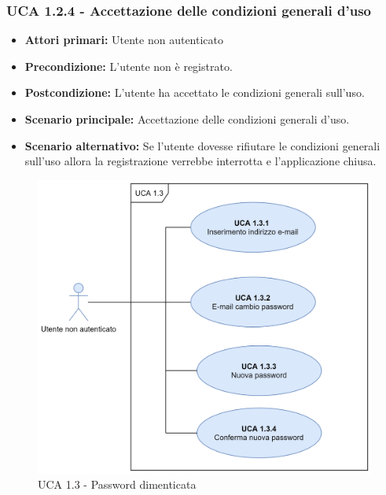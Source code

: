 \subsubsection{UCA 1.2.4 - Accettazione delle condizioni generali d'uso}%
\begin{itemize}
\item \textbf{Attori primari:} Utente non autenticato
\item \textbf{Precondizione:} L'utente non è registrato.
\item \textbf{Postcondizione:} L'utente ha accettato le condizioni generali sull'uso.
\item \textbf{Scenario principale:} Accettazione delle condizioni generali d'uso.
\item \textbf{Scenario alternativo:} Se l'utente dovesse rifiutare le condizioni generali sull'uso allora la registrazione verrebbe interrotta e l'applicazione chiusa.
\end{itemize}

\begin{figure}[h]
	\centering
	\includegraphics[scale=0.6]{Sezioni/UseCase/Immagini/UCA1.3.png}
	\caption{UCA 1.3 - Password dimenticata}
\end{figure}

